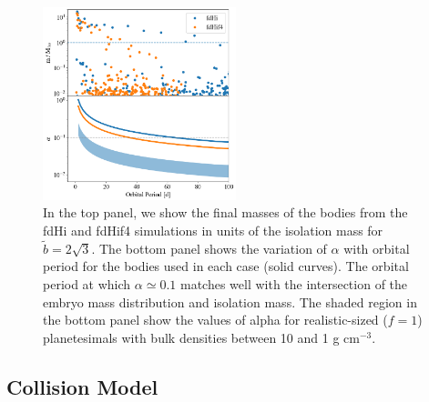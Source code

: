 \documentclass[twocolumn]{aastex63}
\begin{document}
\begin{figure}
\begin{center}
    \includegraphics[width=0.5\textwidth]{figures/f6f4.png}
    \caption{In the top panel, we show the final masses of the bodies
      from the fdHi and fdHif4 simulations in units of the isolation
      mass for $\tilde{b} = 2\sqrt{3}$. The bottom panel shows the variation of $\alpha$ with orbital period for the bodies used in each case (solid curves). The orbital period at which $\alpha \simeq 0.1$ matches well with the intersection of the embryo mass distribution and isolation mass. The shaded region in the bottom panel show the values of alpha for realistic-sized ($f=1$) planetesimals with bulk densities between 10 and 1 g cm$^{-3}$.\label{fig:f6f4}}
\end{center}
\end{figure}


\subsection{Collision Model}
\end{document}
